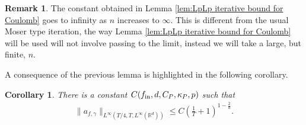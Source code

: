 \documentclass[12pt,american]{amsart}
\numberwithin{equation}{section}
\theoremstyle{plain}
\newtheorem{cor}[thm]{Corollary}
\theoremstyle{definition}                  %
\newtheorem{rem}[thm]{Remark}
\def\fin{f_{\textnormal{in}}}
\begin{document}
\begin{rem}
  The constant obtained in Lemma \ref{lem:LpLp iterative bound for Coulomb} goes to infinity as $n$ increases to $\infty$. This is different from the usual Moser type iteration, the way Lemma \ref{lem:LpLp iterative bound for Coulomb} will be used will not involve passing to the limit, instead we will take a large, but finite, $n$.
\end{rem}

A consequence of the previous lemma is highlighted in the following corollary.
\begin{cor}\label{a_bounded}
  There is a constant $C(\fin,d,C_P,\kappa_P,p)$ such that
  \begin{align*}
    \|a_{f,\gamma}\|_{L^\infty(T/4,T,L^\infty(\mathbb{R}^d))}\leq C\left (\frac{1}{T}+1 \right )^{1-\frac{2}{d}}.
  \end{align*}
  \end{cor}
\end{document}
